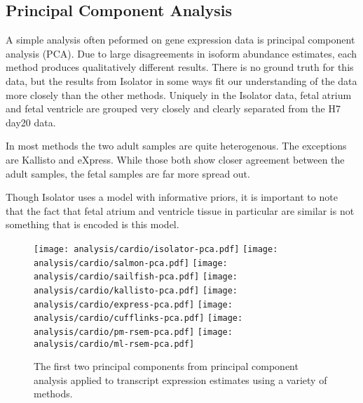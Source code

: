\documentclass{article}
\begin{document}
\subsection{Principal Component Analysis}\label{cardiopca}

A simple analysis often peformed on gene expression data is principal component
analysis (PCA). Due to large disagreements in isoform abundance estimates, each
method produces qualitatively different results. There is no ground truth for
this data, but the results from Isolator in some ways fit our understanding of
the data more closely than the other methods. Uniquely in the Isolator data,
fetal atrium and fetal ventricle are grouped very closely and clearly separated
from the H7 day20 data.

In most methods the two adult samples are quite heterogenous. The exceptions are
Kallisto and eXpress. While those both show closer agreement between the adult
samples, the fetal samples are far more spread out.

Though Isolator uses a model with informative priors, it is important to note
that the fact that fetal atrium and ventricle tissue in particular are similar
is not something that is encoded is this model.

\begin{figure}
\texttt{[image: analysis/cardio/isolator-pca.pdf]}
\texttt{[image: analysis/cardio/salmon-pca.pdf]}
\texttt{[image: analysis/cardio/sailfish-pca.pdf]}
\texttt{[image: analysis/cardio/kallisto-pca.pdf]}
\texttt{[image: analysis/cardio/express-pca.pdf]}
\texttt{[image: analysis/cardio/cufflinks-pca.pdf]}
\texttt{[image: analysis/cardio/pm-rsem-pca.pdf]}
\texttt{[image: analysis/cardio/ml-rsem-pca.pdf]}
\caption{The first two principal components from principal component analysis
applied to transcript expression estimates using a variety of methods.}
\label{fig:cardiopca}
\end{figure}
\end{document}
